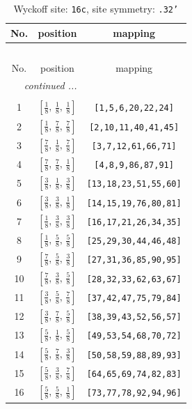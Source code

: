 \documentclass[fleqn,8pt]{jsarticle}
\begin{document}
\begin{longtable}{ccc}
\caption{Wyckoff site: {\tt 16c}, site symmetry: {\tt .32'}}
 \\
 \hline \hline
No. & position & mapping \\ \hline \endfirsthead

\multicolumn{2}{l}{\tablename\ \thetable{}} \\
 \hline \hline
No. & position & mapping \\ \hline \endhead

 \hline \hline
\multicolumn{2}{r}{\footnotesize\it continued ...} \\ \endfoot

 \hline \hline
\multicolumn{2}{r}{} \\ \endlastfoot

1 & $\left[ \frac{1}{8},\, \frac{1}{8},\, \frac{1}{8} \right]$ & {\tt [1,5,6,20,22,24]} \\ \hline
2 & $\left[ \frac{1}{8},\, \frac{7}{8},\, \frac{7}{8} \right]$ & {\tt [2,10,11,40,41,45]} \\ \hline
3 & $\left[ \frac{7}{8},\, \frac{1}{8},\, \frac{7}{8} \right]$ & {\tt [3,7,12,61,66,71]} \\ \hline
4 & $\left[ \frac{7}{8},\, \frac{7}{8},\, \frac{1}{8} \right]$ & {\tt [4,8,9,86,87,91]} \\ \hline
5 & $\left[ \frac{3}{8},\, \frac{1}{8},\, \frac{3}{8} \right]$ & {\tt [13,18,23,51,55,60]} \\ \hline
6 & $\left[ \frac{3}{8},\, \frac{3}{8},\, \frac{1}{8} \right]$ & {\tt [14,15,19,76,80,81]} \\ \hline
7 & $\left[ \frac{1}{8},\, \frac{3}{8},\, \frac{3}{8} \right]$ & {\tt [16,17,21,26,34,35]} \\ \hline
8 & $\left[ \frac{1}{8},\, \frac{5}{8},\, \frac{5}{8} \right]$ & {\tt [25,29,30,44,46,48]} \\ \hline
9 & $\left[ \frac{7}{8},\, \frac{5}{8},\, \frac{3}{8} \right]$ & {\tt [27,31,36,85,90,95]} \\ \hline
10 & $\left[ \frac{7}{8},\, \frac{3}{8},\, \frac{5}{8} \right]$ & {\tt [28,32,33,62,63,67]} \\ \hline
11 & $\left[ \frac{3}{8},\, \frac{5}{8},\, \frac{7}{8} \right]$ & {\tt [37,42,47,75,79,84]} \\ \hline
12 & $\left[ \frac{3}{8},\, \frac{7}{8},\, \frac{5}{8} \right]$ & {\tt [38,39,43,52,56,57]} \\ \hline
13 & $\left[ \frac{5}{8},\, \frac{1}{8},\, \frac{5}{8} \right]$ & {\tt [49,53,54,68,70,72]} \\ \hline
14 & $\left[ \frac{5}{8},\, \frac{7}{8},\, \frac{3}{8} \right]$ & {\tt [50,58,59,88,89,93]} \\ \hline
15 & $\left[ \frac{5}{8},\, \frac{3}{8},\, \frac{7}{8} \right]$ & {\tt [64,65,69,74,82,83]} \\ \hline
16 & $\left[ \frac{5}{8},\, \frac{5}{8},\, \frac{1}{8} \right]$ & {\tt [73,77,78,92,94,96]} \\
\end{longtable}
\end{document}
